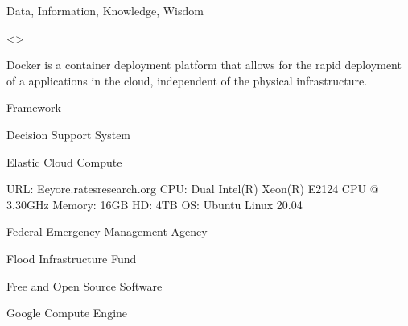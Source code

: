 \documentclass[letterpaper,12pt,english,openany,oneside]{sphinxmanual}
\begin{document}
\begin{description}
\sphinxAtStartPar
Data, Information, Knowledge, Wisdom

\sphinxAtStartPar
\textless{}\textgreater{}

\sphinxAtStartPar
Docker is a container deployment platform that allows for the rapid deployment of a applications in the cloud, independent of the physical infrastructure.

\sphinxAtStartPar
{\hyperref[\detokenize{glossary:term-Django}]{}} {\hyperref[\detokenize{glossary:term-ReST}]{}} Framework

\sphinxAtStartPar
Decision Support System

\sphinxAtStartPar
{\hyperref[\detokenize{glossary:term-AWS}]{}} Elastic Cloud Compute

\sphinxAtStartPar
URL: Eeyore.ratesresearch.org CPU: Dual Intel(R) Xeon(R) E\sphinxhyphen{}2124 CPU @ 3.30GHz Memory: 16GB HD: 4TB OS: Ubuntu Linux 20.04

\sphinxAtStartPar
Federal Emergency Management Agency

\sphinxAtStartPar
Flood Infrastructure Fund

\sphinxAtStartPar
Free and Open Source Software

\sphinxAtStartPar
Google Compute Engine


\end{description}
\end{document}
